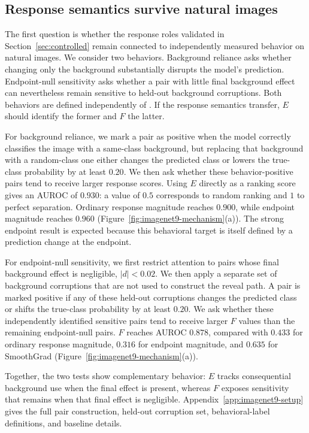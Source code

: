 \subsection{Response semantics survive natural images}

The first question is whether the response roles validated in
Section~\ref{sec:controlled} remain connected to independently measured
behavior on natural images. We consider two behaviors. Background reliance
asks whether changing only the background substantially disrupts the model's
prediction. Endpoint-null sensitivity asks whether a pair with little final
background effect can nevertheless remain sensitive to held-out background
corruptions. Both behaviors are defined independently of \decaf. If the
response semantics transfer, $E$ should identify the former and $F$ the latter.

For background reliance, we mark a pair as positive when the model correctly classifies the image with a same-class background, but replacing that background with a random-class one either changes the predicted class or lowers the true-class probability by at least $0.20$. We then ask whether these behavior-positive pairs tend to receive larger response scores. Using $E$ directly as a ranking score gives an AUROC of $0.930$: a value of $0.5$ corresponds to random ranking and $1$ to perfect separation. Ordinary response magnitude reaches $0.900$, while endpoint magnitude reaches $0.960$ (Figure~\ref{fig:imagenet9-mechanism}(a)). The strong endpoint result is expected because this behavioral target is itself defined by a prediction change at the endpoint.

For endpoint-null sensitivity, we first restrict attention to pairs whose final background effect is negligible, $|d|<0.02$. We then apply a separate set of background corruptions that are not used to construct the reveal path. A pair is marked positive if any of these held-out corruptions changes the predicted class or shifts the true-class probability by at least $0.20$. We ask whether these independently identified sensitive pairs tend to receive larger $F$ values than the remaining endpoint-null pairs. $F$ reaches AUROC $0.878$, compared with $0.433$ for ordinary response magnitude, $0.316$ for endpoint magnitude, and $0.635$ for SmoothGrad (Figure~\ref{fig:imagenet9-mechanism}(a)).

Together, the two tests show complementary behavior: $E$ tracks consequential background use when the final effect is present, whereas $F$ exposes sensitivity that remains when that final effect is negligible. Appendix~\ref{app:imagenet9-setup} gives the full pair construction, held-out corruption set, behavioral-label definitions, and baseline details.


